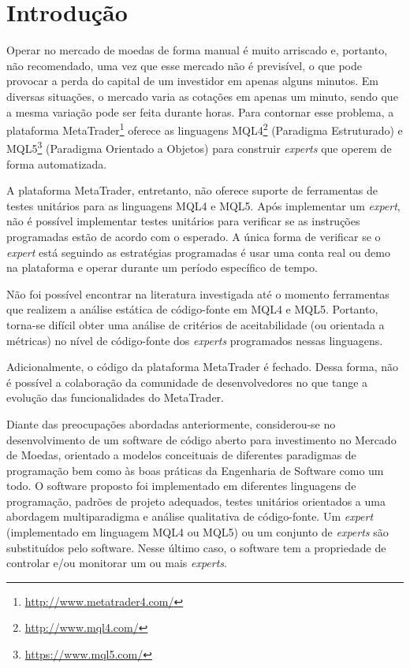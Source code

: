 \chapter{Introdução}

Operar no mercado de moedas de forma manual é muito arriscado e, portanto, não recomendado, uma vez que esse mercado não é previsível, o que pode provocar a perda do capital de um investidor em apenas alguns minutos. Em diversas situações, o mercado varia as cotações em apenas um minuto, sendo que a mesma variação pode ser feita durante horas. Para contornar esse problema, a plataforma MetaTrader\footnote{\url{http://www.metatrader4.com/}} oferece as linguagens MQL4\footnote{\url{http://www.mql4.com/}} (Paradigma Estruturado) e MQL5\footnote{\url{https://www.mql5.com/}} (Paradigma Orientado a Objetos) para construir \textit{experts} que operem de forma automatizada. 

A plataforma MetaTrader, entretanto, não oferece suporte de ferramentas de testes unitários para as linguagens MQL4 e MQL5. Após implementar um \textit{expert}, não é possível implementar testes unitários para verificar se as instruções programadas estão de acordo com o esperado. A única forma de verificar se o \textit{expert} está seguindo as estratégias programadas é usar uma conta real ou demo na plataforma e operar durante um período específico de tempo.

Não foi possível encontrar na literatura investigada até o momento ferramentas que realizem a análise estática de código-fonte em MQL4 e MQL5. Portanto, torna-se difícil obter uma análise de critérios de aceitabilidade (ou orientada a métricas) no nível de código-fonte dos \textit{experts} programados nessas linguagens.

Adicionalmente, o código da plataforma MetaTrader é fechado. Dessa forma, não é possível a colaboração da comunidade de desenvolvedores no que tange a evolução das funcionalidades do MetaTrader.

Diante das preocupações abordadas anteriormente, considerou-se no desenvolvimento de um software de código aberto para investimento no Mercado de Moedas, orientado a modelos conceituais de diferentes paradigmas de programação bem como às boas práticas da Engenharia de Software como um todo. O software proposto foi implementado em diferentes linguagens de programação, padrões de projeto adequados, testes unitários orientados a uma abordagem multiparadigma e análise qualitativa de código-fonte. Um \textit{expert} (implementado em linguagem MQL4 ou MQL5) ou um conjunto de \textit{experts} são substituídos pelo software. Nesse último caso, o software tem a propriedade de controlar e/ou monitorar um ou mais \textit{experts}.

